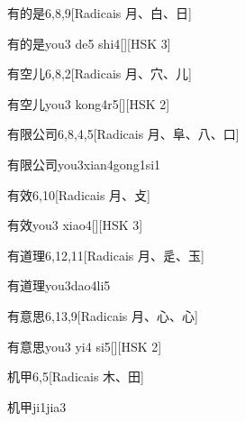 \begin{entry}{有的是}{6,8,9}[Radicais ⽉、⽩、⽇]
  \begin{phonetics}{有的是}{you3 de5 shi4}[][HSK 3]
  \end{phonetics}
\end{entry}

\begin{entry}{有空儿}{6,8,2}[Radicais ⽉、⽳、⼉]
  \begin{phonetics}{有空儿}{you3 kong4r5}[][HSK 2]
  \end{phonetics}
\end{entry}

\begin{entry}{有限公司}{6,8,4,5}[Radicais ⽉、⾩、⼋、⼝]
  \begin{phonetics}{有限公司}{you3xian4gong1si1}
  \end{phonetics}
\end{entry}

\begin{entry}{有效}{6,10}[Radicais ⽉、⽁]
  \begin{phonetics}{有效}{you3 xiao4}[][HSK 3]
  \end{phonetics}
\end{entry}

\begin{entry}{有道理}{6,12,11}[Radicais ⽉、⾡、⽟]
  \begin{phonetics}{有道理}{you3dao4li5}
  \end{phonetics}
\end{entry}

\begin{entry}{有意思}{6,13,9}[Radicais ⽉、⼼、⼼]
  \begin{phonetics}{有意思}{you3 yi4 si5}[][HSK 2]
  \end{phonetics}
\end{entry}

\begin{entry}{机甲}{6,5}[Radicais ⽊、⽥]
  \begin{phonetics}{机甲}{ji1jia3}
  \end{phonetics}
\end{entry}

